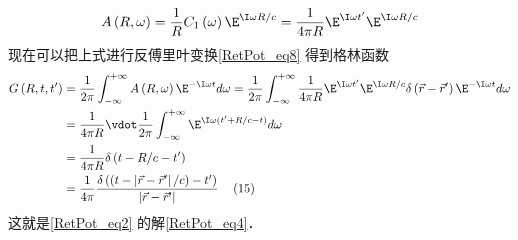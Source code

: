 \begin{equation}
A\left( {R,\omega } \right) = \frac{1}{R}{C_1}\left( \omega  \right){\E^{\I\omega R/c}} = \frac{1}{{4\pi R}}{\E^{\I\omega t'}}{\E^{\I\omega R/c}}
\end{equation} 
现在可以把上式进行反傅里叶变换\autoref{RetPot_eq8} 得到格林函数
\begin{equation}
\begin{aligned}
G\left( {R,t,t'} \right) &= \frac{1}{{2\pi }}\int_{ - \infty }^{ + \infty } {A\left( {R,\omega } \right){\E^{ -\I\omega t}}d\omega }  = \frac{1}{{2\pi }}\int_{ - \infty }^{ + \infty } {\frac{1}{{4\pi R}}{\E^{\I\omega t'}}{\E^{\I\omega R/c}}\delta \left( {\vec r - \vec r'} \right){\E^{ -\I\omega t}}d\omega } \\
&= \frac{1}{{4\pi R}} \vdot \frac{1}{{2\pi }}\int_{ - \infty }^{ + \infty } {{\E^{\I\omega (t' + R/c - t)}}d\omega } \\
&= \frac{1}{{4\pi R}}\delta \left( {t - R/c - t'} \right)\\
&= \frac{1}{{4\pi }}\frac{{\delta \left( {\left( {t - \left| {\vec r - \vec r'} \right|/c} \right) - t'} \right)}}{{\left| {\vec r - \vec r'} \right|}}{\kern 1pt} {\kern 1pt} {\kern 1pt} {\kern 1pt} {\kern 1pt} {\kern 1pt} {\kern 1pt} {\kern 1pt} {\kern 1pt} {\kern 1pt} {\kern 1pt} {\kern 1pt} (15)
\end{aligned}
\end{equation} 
这就是\autoref{RetPot_eq2} 的解\autoref{RetPot_eq4}． 

